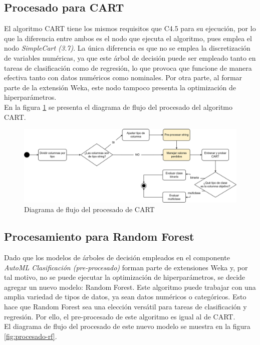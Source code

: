 \subsection{Procesado para CART}
El algoritmo CART tiene los mismos requisitos que C4.5 para su ejecución, por lo que la diferencia entre ambos es el nodo que ejecuta el algoritmo, pues emplea el nodo \textit{SimpleCart (3.7)}. La única diferencia es que no se emplea la discretización de variables numéricas, ya que este árbol de decisión puede ser empleado tanto en tareas de clasificación como de regresión, lo que provoca que funcione de manera efectiva tanto con datos numéricos como nominales. Por otra parte, al formar parte de la extensión Weka, este nodo tampoco presenta la optimización de hiperparámetros. \\
En la figura \ref{fig:procesado-cart} se presenta el diagrama de flujo del procesado del algoritmo CART.

\begin{figure}[H]
	\centering
	\includegraphics[width=1\linewidth]{"figuras/capi 2/modelos/procesado cart.drawio"}
	\caption{Diagrama de flujo del procesado de CART}
	\label{fig:procesado-cart}
\end{figure}


\subsection{Procesamiento para Random Forest}
Dado que los modelos de árboles de decisión empleados en el componente \textit{AutoML Clasificación (pre-procesado)} forman parte de extensiones Weka y, por tal motivo, no se puede ejecutar la optimización de hiperparámetros, se decide agregar un nuevo modelo: Random Forest. Este algoritmo puede trabajar con una amplia variedad de tipos de datos, ya sean datos numéricos o categóricos. Esto hace que Random Forest sea una elección versátil para tareas de clasificación y regresión. Por ello, el pre-procesado de este algoritmo es igual al de CART. \\
El diagrama de flujo del procesado de este nuevo modelo se muestra en la figura \ref{fig:procesado-rf}.

